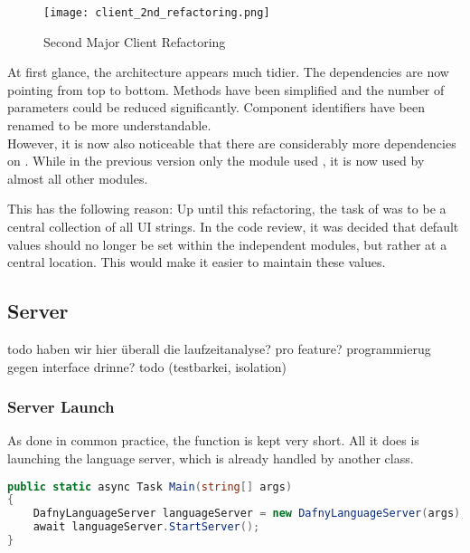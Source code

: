 \begin{figure}[H]
    \centering
    \texttt{[image: client\_2nd\_refactoring.png]}
    \caption{Second Major Client Refactoring}
    \label{fig:client_2nd_refactoring}
\end{figure}

At first glance, the architecture appears much tidier.
The dependencies are now pointing from top to bottom.
Methods have been simplified and the number of parameters could be reduced significantly.
Component identifiers have been renamed to be more understandable. \\

However, it is now also noticeable that there are considerably more dependencies on .
While in the previous version only the module  used , it is now used by almost all other modules.

This has the following reason: Up until this refactoring, the task of  was to be a central collection of all UI strings. 
In the code review, it was decided that default values should no longer be set within the independent modules,
but rather at a central location.
This would make it easier to maintain these values. \\


\subsection{Server}

todo haben wir hier überall die laufzeitanalyse? pro feature?
programmierug gegen interface drinne? todo (testbarkei, isolation)

\subsubsection{Server Launch}
As done in common practice, the  function is kept very short.
All it does is launching the language server, which is already handled by another class.

\begin{lstlisting}[language=csharp, caption={Main Function}, captionpos=b, label={lst:main}]
public static async Task Main(string[] args)
{
    DafnyLanguageServer languageServer = new DafnyLanguageServer(args);
    await languageServer.StartServer();
}
\end{lstlisting}


